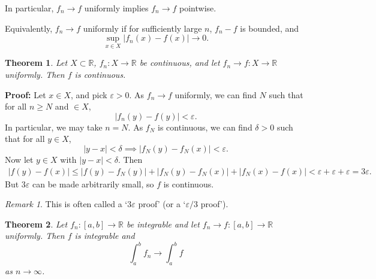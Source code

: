 \documentclass[12pt]{article}
\newtheorem{theorem}{Theorem}[section]
\theoremstyle{definition}
\theoremstyle{remark}
\newtheorem*{remark}{Remark}
\begin{document}
In particular, $f_n \to f$ uniformly implies $f_n \to f$ pointwise.

Equivalently, $f_n \to f$ uniformly if for sufficiently large $n$, $f_n - f$ is bounded, and
\[
	\sup_{x \in X} |f_n(x) - f(x)| \to 0
.\]

\begin{theorem}
	Let $X \subset \mathbb{R}$, $f_n : X \to \mathbb{R}$ be continuous, and let $f_n \to f : X \to \mathbb{R}$ uniformly. Then $f$ is continuous.
\end{theorem}

\begin{adjustbox}{minipage = \columnwidth - 25.5pt, margin=1em, frame=1pt, margin=0em}
	\textbf{Proof:} Let $x \in X$, and pick $\varepsilon > 0$. As $f_n \to f$ uniformly, we can find $N$ such that for all $n \geq N$ and $ \in X$,
	\[
		|f_n(y) - f(y)| < \varepsilon
	.\]
	In particular, we may take $n = N$. As $f_N$ is continuous, we can find $\delta > 0$ such that for all $y \in X$, 
	\[
		|y - x| < \delta \implies |f_N(y) - f_N(x)| < \varepsilon
	.\]
	Now let $y \in X$ with $|y - x| < \delta$. Then
	\begin{align*}
		|f(y) - f(x)| \leq |f(y) - f_N(y)| + |f_N(y) - f_N(x)| + |f_N(x) - f(x)| < \varepsilon + \varepsilon + \varepsilon = 3 \varepsilon.
	\end{align*}
	But $3\varepsilon$ can be made arbitrarily small, so $f$ is continuous.
\end{adjustbox}

\begin{remark}
	This is often called a `$3\varepsilon$ proof' (or a `$\varepsilon/3$ proof').
\end{remark}

\begin{theorem} 
	Let $f_n : [a, b] \to \mathbb{R}$ be integrable and let $f_n \to f : [a, b] \to \mathbb{R}$ uniformly. Then $f$ is integrable and
	\[
	\int_{a}^{b} f_n \to \int_{a}^{b} f
	\]
	as $n \to \infty$.
\end{theorem}
\end{document}
